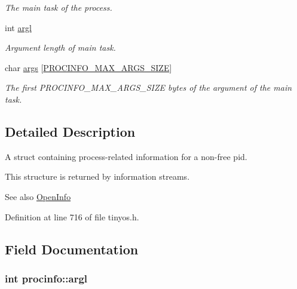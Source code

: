 \begin{DoxyCompactItemize}
\begin{DoxyCompactList}\small\item\em The main task of the process. \end{DoxyCompactList}\item 
int \hyperlink{structprocinfo_ac63081c5a10bc230c115eea36c5f22fd}{argl}
\begin{DoxyCompactList}\small\item\em Argument length of main task. \end{DoxyCompactList}\item 
char \hyperlink{structprocinfo_ac812ea3215fafc8ced9f91320b2d3959}{args} \mbox{[}\hyperlink{group__syscalls_ga657ad9e9d81dcca25fb225cf99051e0d}{P\+R\+O\+C\+I\+N\+F\+O\+\_\+\+M\+A\+X\+\_\+\+A\+R\+G\+S\+\_\+\+S\+I\+ZE}\mbox{]}
\begin{DoxyCompactList}\small\item\em The first {\ttfamily P\+R\+O\+C\+I\+N\+F\+O\+\_\+\+M\+A\+X\+\_\+\+A\+R\+G\+S\+\_\+\+S\+I\+ZE} bytes of the argument of the main task. \end{DoxyCompactList}\end{DoxyCompactItemize}


\subsection{Detailed Description}
A struct containing process-\/related information for a non-\/free pid. 

This structure is returned by information streams. \begin{DoxySeeAlso}{See also}
\hyperlink{group__syscalls_gaf326b11574cdc84a9e21b9d860076821}{Open\+Info} 
\end{DoxySeeAlso}


Definition at line 716 of file tinyos.\+h.



\subsection{Field Documentation}
\subsubsection[{\texorpdfstring{argl}{argl}}]{\setlength{\rightskip}{0pt plus 5cm}int procinfo\+::argl}\hypertarget{structprocinfo_ac63081c5a10bc230c115eea36c5f22fd}{}\label{structprocinfo_ac63081c5a10bc230c115eea36c5f22fd}


